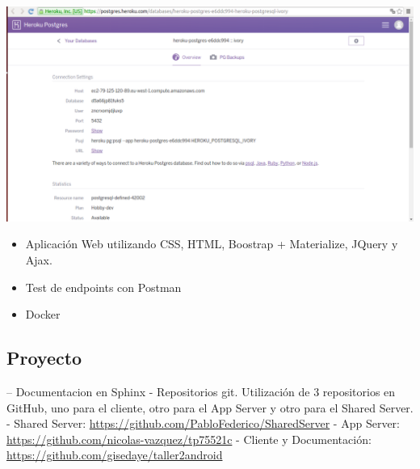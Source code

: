 \documentclass[letterpaper,10pt,english]{sphinxmanual}
\begin{document}
\includegraphics{postgresql.png}
\begin{itemize}
\item {} 
Aplicación Web utilizando CSS, HTML, Boostrap + Materialize, JQuery y Ajax.

\item {} 
Test  de endpoints con Postman

\item {} 
Docker

\end{itemize}


\subsection{Proyecto}
\label{manuals:proyecto}
-- Documentacion en Sphinx
- Repositorios git. Utilización de 3 repositorios en GitHub, uno para el cliente, otro para el App Server y otro para el Shared Server.
- Shared Server: \href{https://github.com/PabloFederico/SharedServer}{https://github.com/PabloFederico/SharedServer}
- App Server: \href{https://github.com/nicolas-vazquez/tp75521c}{https://github.com/nicolas-vazquez/tp75521c}
- Cliente y Documentación: \href{https://github.com/gisedaye/taller2android}{https://github.com/gisedaye/taller2android}
\end{document}
